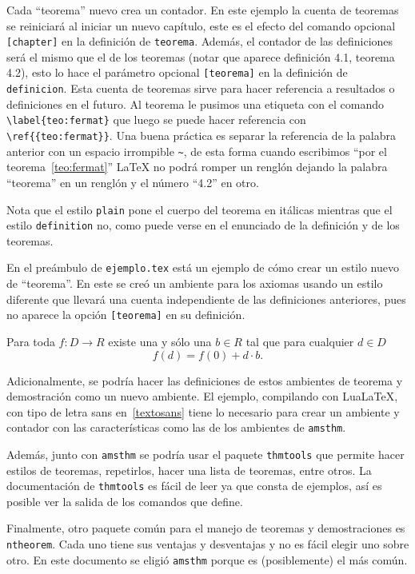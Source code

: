 Cada ``teorema'' nuevo crea un contador. En este ejemplo la cuenta de
teoremas se reiniciará al iniciar un nuevo capítulo, este es el efecto del
comando opcional \texttt{[chapter]} en la definición de \texttt{teorema}.
Además, el contador de las definiciones será el mismo que el de los teoremas
(notar que aparece definición 4.1, teorema 4.2), esto lo hace el parámetro
opcional \texttt{[teorema]} en la definición de \texttt{definicion}. Esta
cuenta de teoremas sirve para hacer referencia a resultados o definiciones
en el futuro. Al teorema le pusimos una etiqueta con el comando
\verb|\label{teo:fermat}| que luego se puede hacer referencia con
\verb|\ref{{teo:fermat}}|. Una buena práctica es separar la referencia de la
palabra anterior con un espacio irrompible \verb|~|, de esta forma cuando
escribimos ``por el teorema~\ref{teo:fermat}'' \LaTeX{} no podrá romper un
renglón dejando la palabra ``teorema'' en un renglón y el número ``4.2'' en
otro.

Nota que el estilo \texttt{plain} pone el cuerpo del teorema en itálicas
mientras que el estilo \texttt{definition} no, como puede verse en el
enunciado de la definición y de los teoremas.

En el preámbulo de \texttt{ejemplo.tex} está un ejemplo de cómo crear un
estilo nuevo de ``teorema''. En este se creó un ambiente para los axiomas
usando un estilo diferente que llevará una cuenta independiente de las
definiciones anteriores, pues no aparece la opción \texttt{[teorema]} en su
definición.

\begin{axioma}
  Para toda \(f\colon D\to R\) existe una y sólo una \(b\in R\) tal que para
  cualquier \(d\in D\)
  \[
    f(d)=f(0)+d\cdot b.
  \]
\end{axioma}

Adicionalmente, se podría hacer las definiciones de estos ambientes de
teorema y demostración como un nuevo ambiente. El ejemplo, compilando con
Lua\LaTeX, con tipo de letra sans en~\ref{textosans} tiene lo necesario para
crear un ambiente y contador con las características como las de los
ambientes de \texttt{amsthm}.

Además, junto con \texttt{amsthm} se podría usar el paquete
\texttt{thmtools} que permite hacer estilos de teoremas, repetirlos, hacer
una lista de teoremas, entre otros. La documentación de \texttt{thmtools} es
fácil de leer ya que consta de ejemplos, así es posible ver la salida de los
comandos que define.

Finalmente, otro paquete común para el manejo de teoremas y demostraciones
es \texttt{ntheorem}. Cada uno tiene sus ventajas y desventajas y no es
fácil elegir uno sobre otro. En este documento se eligió \texttt{amsthm}
porque es (posiblemente) el más común.


